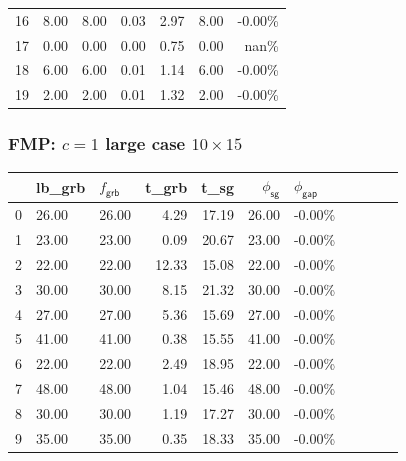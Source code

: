 \begin{frame}
\begin{tabular}{lllrrrr}
    16 & 8.00    & 8.00                   & 0.03                    & 2.97 & 8.00  & -0.00\% \\
    17 & 0.00    & 0.00                   & 0.00                    & 0.75 & 0.00  & nan\%   \\
    18 & 6.00    & 6.00                   & 0.01                    & 1.14 & 6.00  & -0.00\% \\
    19 & 2.00    & 2.00                   & 0.01                    & 1.32 & 2.00  & -0.00\% \\
    \bottomrule
  \end{tabular}
  \normalsize
\end{frame}

\begin{frame}
  \frametitle{FMP: \(c = 1\) large case \(10\times 15\)}
  \scriptsize
  \begin{tabular}{lllrrrlllll}
    \toprule
    {} & lb\_grb & \(f_{\textsf{grb}}\)   & t\_grb
       & t\_sg   & \(\phi_{\textsf{sg}}\) & \(\phi_{\textsf{gap}}\)                           \\
    \midrule
    0  & 26.00   & 26.00                  & 4.29                    & 17.19 & 26.00 & -0.00\% \\
    1  & 23.00   & 23.00                  & 0.09                    & 20.67 & 23.00 & -0.00\% \\
    2  & 22.00   & 22.00                  & 12.33                   & 15.08 & 22.00 & -0.00\% \\
    3  & 30.00   & 30.00                  & 8.15                    & 21.32 & 30.00 & -0.00\% \\
    4  & 27.00   & 27.00                  & 5.36                    & 15.69 & 27.00 & -0.00\% \\
    5  & 41.00   & 41.00                  & 0.38                    & 15.55 & 41.00 & -0.00\% \\
    6  & 22.00   & 22.00                  & 2.49                    & 18.95 & 22.00 & -0.00\% \\
    7  & 48.00   & 48.00                  & 1.04                    & 15.46 & 48.00 & -0.00\% \\
    8  & 30.00   & 30.00                  & 1.19                    & 17.27 & 30.00 & -0.00\% \\
    9  & 35.00   & 35.00                  & 0.35                    & 18.33 & 35.00 & -0.00\% \\

\end{tabular}
\end{frame}
